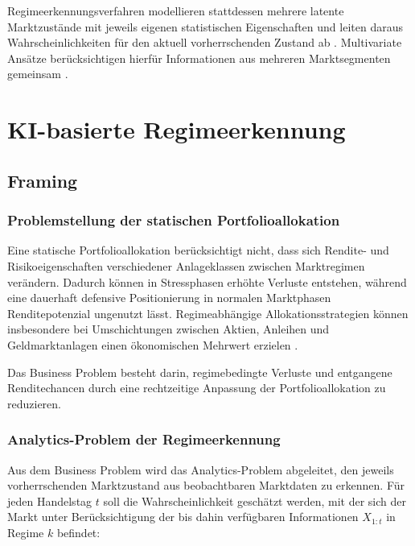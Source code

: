\vspace{0.5cm}

Regimeerkennungsverfahren modellieren stattdessen mehrere latente Marktzustände mit jeweils eigenen statistischen Eigenschaften und leiten daraus Wahrscheinlichkeiten für den aktuell vorherrschenden Zustand ab \cite[3–7]{yuan_market_2016}. Multivariate Ansätze berücksichtigen hierfür Informationen aus mehreren Marktsegmenten gemeinsam \cite[3–6]{polavarapu_cross-asset_2026}.

\section{KI-basierte Regimeerkennung}

\subsection{Framing}
\subsubsection{Problemstellung der statischen Portfolioallokation}
Eine statische Portfolioallokation berücksichtigt nicht, dass sich Rendite- und Risikoeigenschaften verschiedener Anlageklassen zwischen Marktregimen verändern. Dadurch können in Stressphasen erhöhte Verluste entstehen, während eine dauerhaft defensive Positionierung in normalen Marktphasen Renditepotenzial ungenutzt lässt. Regimeabhängige Allokationsstrategien können insbesondere bei Umschichtungen zwischen Aktien, Anleihen und Geldmarktanlagen einen ökonomischen Mehrwert erzielen \cite[1179–1182]{ang_international_2002}.

\vspace{0.5cm}

Das Business Problem besteht darin, regimebedingte Verluste und entgangene Renditechancen durch eine rechtzeitige Anpassung der Portfolioallokation zu reduzieren.

\subsubsection{Analytics-Problem der Regimeerkennung}
Aus dem Business Problem wird das Analytics-Problem abgeleitet, den jeweils vorherrschenden Marktzustand aus beobachtbaren Marktdaten zu erkennen. Für jeden Handelstag $t$ soll die Wahrscheinlichkeit geschätzt werden, mit der sich der Markt unter Berücksichtigung der bis dahin verfügbaren Informationen $X_{1:t}$ in Regime $k$ befindet:

